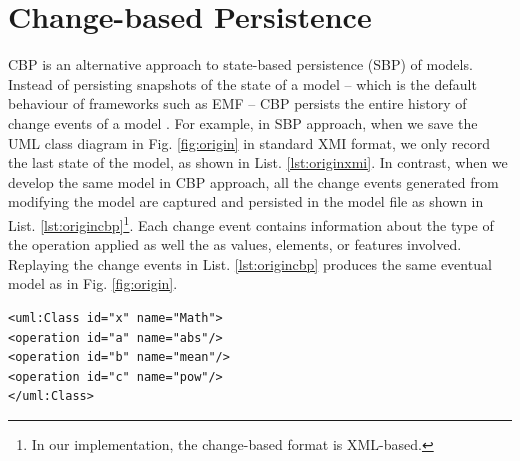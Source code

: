 \vspace{-10pt}
\section{Change-based Persistence}
\label{sec:change-based_persistence}

\vspace{-5pt}
CBP is an alternative approach to state-based persistence (SBP) of models. Instead of persisting snapshots of the state of a model -- which is the default behaviour of frameworks such as EMF -- CBP persists the entire history of change events of a model \cite{yohannis2018towards}. For example, in SBP approach, when we save the UML class diagram in Fig. \ref{fig:origin} in standard XMI format, we only record the last state of the model, as shown in List. \ref{lst:originxmi}. In contrast, when we develop the same model in CBP approach, all the change events generated from modifying the model are captured and persisted in the model file as shown in List. \ref{lst:origincbp}\footnote{In our implementation, the change-based format is XML-based.}. 
Each change event contains information about the type of the operation applied as well the as values, elements, or features involved. Replaying the change events in List. \ref{lst:origincbp} produces the same eventual model as in Fig. \ref{fig:origin}.

\vspace{-15pt}
\begin{lstlisting}[style=eol,caption={The simplified XMI of the model in Fig. \ref{fig:origin}.},label=lst:originxmi]
<uml:Class id="x" name="Math">
<operation id="a" name="abs"/>
<operation id="b" name="mean"/>
<operation id="c" name="pow"/>
</uml:Class>
\end{lstlisting}

